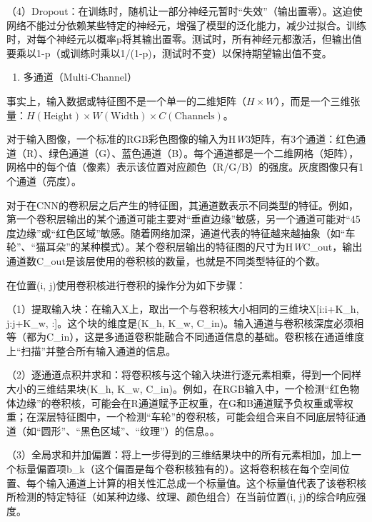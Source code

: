 （4）Dropout：在训练时，随机让一部分神经元暂时``失效''（输出置零）。这迫使网络不能过分依赖某些特定的神经元，增强了模型的泛化能力，减少过拟合。训练时，对每个神经元以概率p将其输出置零。测试时，所有神经元都激活，但输出值要乘以1-p（或训练时乘以1/(1-p)，测试时不变）以保持期望输出值不变。

\begin{enumerate}
\def\labelenumi{\arabic{enumi}.}
\setcounter{enumi}{5}
\tightlist
\item
  多通道（Multi-Channel）
\end{enumerate}

事实上，输入数据或特征图不是一个单一的二维矩阵（\(H \times W\)），而是一个三维张量：\(H(\mathrm{Height}) \times W(\mathrm{Width}) \times C(\mathrm{Channels})\)。

对于输入图像，一个标准的RGB彩色图像的输入为H\emph{W}3矩阵，有3个通道：红色通道（R）、绿色通道（G）、蓝色通道（B）。每个通道都是一个二维网格（矩阵），网格中的每个值（像素）表示该位置对应颜色（R/G/B）的强度。灰度图像只有1个通道（亮度）。

对于在CNN的卷积层之后产生的特征图，其通道数表示不同类型的特征。例如，第一个卷积层输出的某个通道可能主要对``垂直边缘''敏感，另一个通道可能对``45度边缘''或``红色区域''敏感。随着网络加深，通道代表的特征越来越抽象（如``车轮''、``猫耳朵''的某种模式）。某个卷积层输出的特征图的尺寸为H\emph{W}C\_out，输出通道数C\_out是该层使用的卷积核的数量，也就是不同类型特征的个数。

在位置(i, j)使用卷积核进行卷积的操作分为如下步骤：

（1）提取输入块：在输入X上，取出一个与卷积核大小相同的三维块X{[}i:i+K\_h, j:j+K\_w, :{]}。这个块的维度是(K\_h, K\_w, C\_in)。输入通道与卷积核深度必须相等（都为C\_in），这是多通道卷积能融合不同通道信息的基础。卷积核在通道维度上``扫描''并整合所有输入通道的信息。

（2）逐通道点积并求和：将卷积核与这个输入块进行逐元素相乘，得到一个同样大小的三维结果块(K\_h, K\_w, C\_in)。例如，在RGB输入中，一个检测``红色物体边缘''的卷积核，可能会在R通道赋予正权重，在G和B通道赋予负权重或零权重；在深层特征图中，一个检测``车轮''的卷积核，可能会组合来自不同底层特征通道（如``圆形''、``黑色区域''、``纹理''）的信息。。

（3）全局求和并加偏置：将上一步得到的三维结果块中的所有元素相加，加上一个标量偏置项b\_k（这个偏置是每个卷积核独有的）。这将卷积核在每个空间位置、每个输入通道上计算的相关性汇总成一个标量值。这个标量值代表了该卷积核所检测的特定特征（如某种边缘、纹理、颜色组合）在当前位置(i, j)的综合响应强度。


